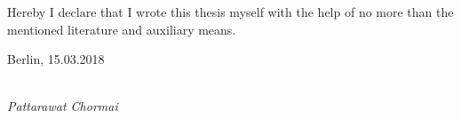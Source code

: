\newpage

\thispagestyle{empty}

\begin{large}

\vspace*{6cm}

\noindent
Hereby I declare that I wrote this thesis myself with the help of no more than the mentioned literature and auxiliary means.
\vspace{2cm}

\noindent
Berlin, 15.03.2018

\vspace{3cm}

\hspace*{7cm}%
\dotfill\\
\hspace*{8.5cm}%
\textit{Pattarawat Chormai}

\end{large}
